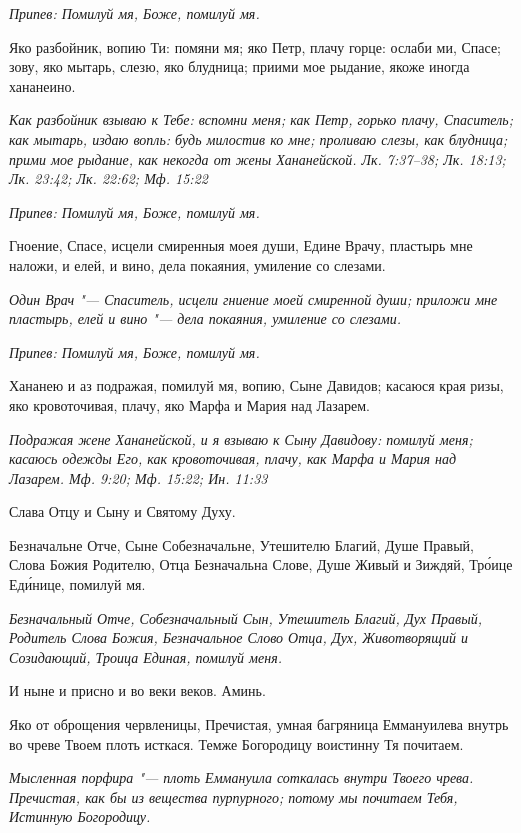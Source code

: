 \itshape Припев:\normalfont{} Помилуй мя, Боже, помилуй мя.


Яко разбойник, вопию Ти: помяни мя; яко Петр, плачу горце: ослаби ми, Спасе; зову, яко мытарь, слезю, яко блудница; приими мое рыдание, якоже иногда хананеино.


\itshape Как разбойник взываю к Тебе: вспомни меня; как Петр, горько плачу, Спаситель; как мытарь, издаю вопль: будь милостив ко мне; проливаю слезы, как блудница; прими мое рыдание, как некогда от жены Хананейской. Лк. 7:37–38; Лк. 18:13; Лк. 23:42; Лк. 22:62; Мф. 15:22\normalfont{}


\itshape Припев:\normalfont{} Помилуй мя, Боже, помилуй мя.


Гноение, Спасе, исцели смиренныя моея души, Едине Врачу, пластырь мне наложи, и елей, и вино, дела покаяния, умиление со слезами.


\itshape Один Врач "--- Спаситель, исцели гниение моей смиренной души; приложи мне пластырь, елей и вино "--- дела покаяния, умиление со слезами.\normalfont{}


\itshape Припев:\normalfont{} Помилуй мя, Боже, помилуй мя.


Хананею и аз подражая, помилуй мя, вопию, Сыне Давидов; касаюся края ризы, яко кровоточивая, плачу, яко Марфа и Мария над Лазарем.


\itshape Подражая жене Хананейской, и я взываю к Сыну Давидову: помилуй меня; касаюсь одежды Его, как кровоточивая, плачу, как Марфа и Мария над Лазарем. Мф. 9:20; Мф. 15:22; Ин. 11:33\normalfont{}


Слава Отцу и Сыну и Святому Духу.


Безначальне Отче, Сыне Собезначальне, Утешителю Благий, Душе Правый, Слова Божия Родителю, Отца Безначальна Слове, Душе Живый и Зиждяй, Тро́ице Еди́нице, помилуй мя.


\itshape Безначальный Отче, Собезначальный Сын, Утешитель Благий, Дух Правый, Родитель Слова Божия, Безначальное Слово Отца, Дух, Животворящий и Созидающий, Троица Единая, помилуй меня.\normalfont{}


И ныне и присно и во веки веков. Аминь.


Яко от оброщения червленицы, Пречистая, умная багряница Еммануилева внутрь во чреве Твоем плоть исткася. Темже Богородицу воистинну Тя почитаем.


\itshape Мысленная порфира "--- плоть Еммануила соткалась внутри Твоего чрева. Пречистая, как бы из вещества пурпурного; потому мы почитаем Тебя, Истинную Богородицу.\normalfont{}





